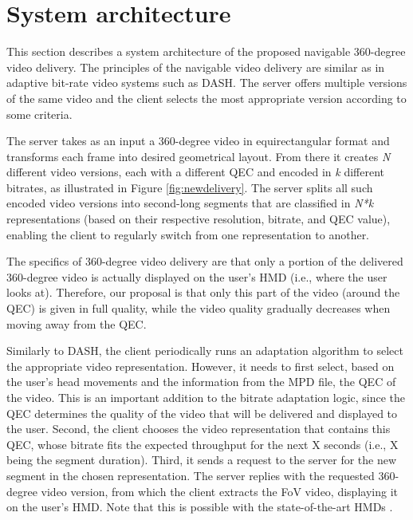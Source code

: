

\section{System architecture}

This section describes a system architecture of the proposed navigable 360-degree video delivery. The principles of the navigable video delivery are similar as in adaptive bit-rate
video systems such as \ac{DASH}\cite{Stockhammer11}. The server offers multiple versions of the same video
and the client selects the most appropriate version according to some criteria. %

The server takes as an input a 360-degree video in equirectangular format and transforms each frame into desired geometrical layout. From there it creates \textit{N} different video versions, each with a different QEC and encoded in \textit{k} different bitrates, as illustrated in Figure \ref{fig:newdelivery}. The server splits all such encoded video versions into second-long segments that are classified in \textit{N*k} representations (based on their respective resolution, bitrate, and QEC value), enabling the client to regularly switch from one representation to another.

The specifics of 360-degree video delivery are that only a portion of the delivered 360-degree video is actually displayed on the user's HMD (i.e., where the user looks at). Therefore, our proposal is that only this part of the video (around the QEC) is given in full quality, while the video quality gradually decreases when moving away from the QEC. 

Similarly to DASH, the client periodically runs an adaptation algorithm to select the appropriate video representation. However, it needs to first select, based on the user's head movements and the information from the MPD file, the QEC of the video. This is an important addition to the bitrate adaptation logic, since the QEC determines the quality of the video that will be delivered and displayed to the user. Second, the client chooses the video representation that contains this QEC, whose bitrate fits the expected throughput for the next X seconds (i.e., X being the segment duration). Third, it sends a request to the server for the new segment in the chosen representation. The server replies with the requested 360-degree video version, from which the client extracts the FoV video, displaying it on the user's HMD. Note that this is possible with the state-of-the-art HMDs \cite{}.

